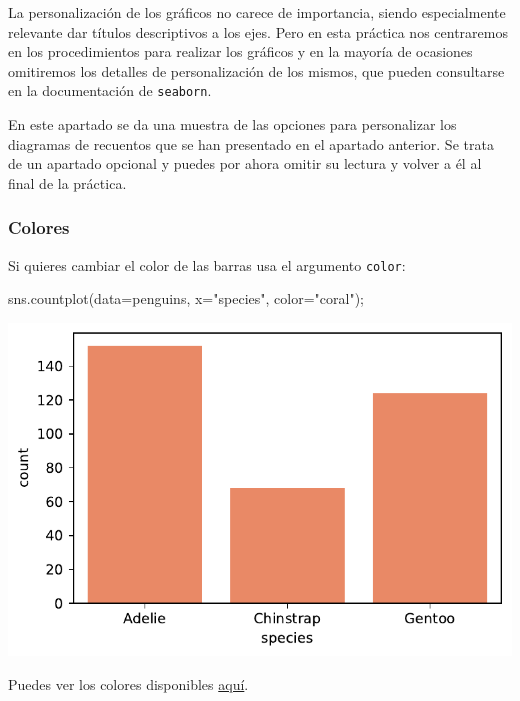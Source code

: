 \documentclass[
  a4paper,
  noprof,
  12pt,
  notoc,
  nosols,
  nobib]{mnye}
\newenvironment{Shaded}{\begin{snugshade}}{\end{snugshade}}
\newcommand{\NormalTok}[1]{\textcolor[rgb]{0.00,0.23,0.31}{#1}}
\newcommand{\OperatorTok}[1]{\textcolor[rgb]{0.37,0.37,0.37}{#1}}
\newcommand{\StringTok}[1]{\textcolor[rgb]{0.13,0.47,0.30}{#1}}
\theoremstyle{definition}
\theoremstyle{remark}
\begin{document}
La personalización de los gráficos no carece de importancia, siendo
especialmente relevante dar títulos descriptivos a los ejes. Pero en
esta práctica nos centraremos en los procedimientos para realizar los
gráficos y en la mayoría de ocasiones omitiremos los detalles de
personalización de los mismos, que pueden consultarse en la
documentación de \texttt{seaborn}.

En este apartado se da una muestra de las opciones para personalizar los
diagramas de recuentos que se han presentado en el apartado anterior. Se
trata de un apartado opcional y puedes por ahora omitir su lectura y
volver a él al final de la práctica.

\subsubsection{Colores}\label{colores}

Si quieres cambiar el color de las barras usa el argumento
\texttt{color}:

\begin{Shaded}
\begin{Highlighting}[]
\NormalTok{sns.countplot(data}\OperatorTok{=}\NormalTok{penguins, x}\OperatorTok{=}\StringTok{"species"}\NormalTok{, color}\OperatorTok{=}\StringTok{"coral"}\NormalTok{)}\OperatorTok{;}
\end{Highlighting}
\end{Shaded}

\includegraphics{chapters/1categorical_files/figure-pdf/cell-8-output-1.pdf}

Puedes ver los colores disponibles
\href{https://matplotlib.org/stable/tutorials/colors/colors.html}{aquí}.
\end{document}
